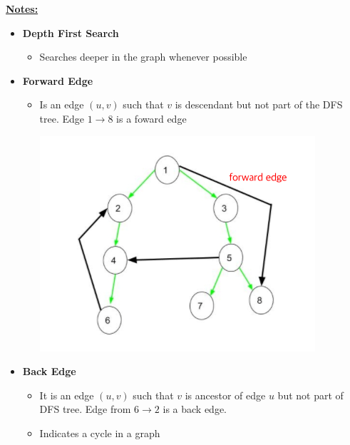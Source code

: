 \documentclass[12pt]{article}
\begin{document}
\begin{enumerate}[1.]
    \bigskip

    \underline{\textbf{Notes:}}

    \bigskip

    \begin{itemize}
        \item \textbf{Depth First Search}

        \begin{itemize}
            \item Searches deeper in the graph whenever possible
        \end{itemize}

        \item \textbf{Forward Edge}

        \begin{itemize}
            \item Is an edge $(u,v)$ such that $v$ is descendant but not part of
            the DFS tree. Edge $1 \to 8$ is a foward edge

            \begin{center}
            \includegraphics[width=0.6\linewidth]{images/worksheet_4_solution_23.png}
            \end{center}
         \end{itemize}

         \item \textbf{Back Edge}

        \begin{itemize}
            \item It is an edge $(u, v)$ such that $v$ is ancestor of edge $u$
            but not part of DFS tree. Edge from $6 \to 2$ is a back edge.
            \item Indicates a cycle in a graph


\end{itemize}
\end{itemize}
\end{enumerate}
\end{document}
